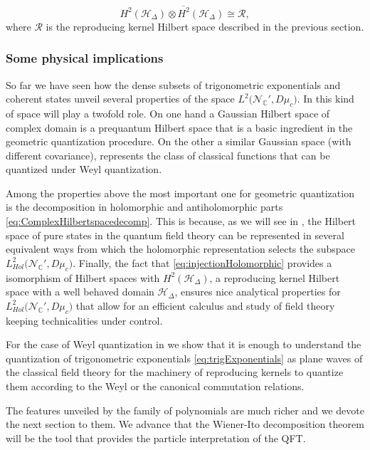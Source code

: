 \documentclass{elsarticle}%
\begin{document}
\begin{equation}
\label{eq:isomorphism}
    H^2(\mathcal{H}_\Delta)\otimes \overline{H^2}(\mathcal{H}_\Delta) \cong \mathcal{R},
\end{equation}
where $\mathcal{R}$ is the reproducing kernel Hilbert space described in the previous section.

\subsubsection{ Some physical implications}

So far we have seen how the dense subsets of trigonometric exponentials and coherent states unveil several properties of the space $L^2\big({\mathcal{N}_{\mathbb{C}}'},D\mu_c\big)$. In \cite{alonsoGeometricFlavours2024} this kind of  space will play a twofold role. On one hand a Gaussian Hilbert space of complex domain is a prequantum Hilbert space that is a  basic ingredient in the geometric quantization procedure. On the other a similar Gaussian space (with different covariance), represents the class of classical functions that can be quantized under Weyl quantization.

Among  the properties above the most important one for geometric quantization is the decomposition in holomorphic and antiholomorphic parts \eqref{eq:ComplexHilbertspacedecomp}. This is because, as we will see in \cite{alonsoGeometricFlavours2024}, the Hilbert space of pure states in the quantum field theory can be represented in several equivalent ways from which the holomorphic representation selects the subspace  $L^2_{Hol}\big({\mathcal{N}_{\mathbb{C}}'},D\mu_c\big)$.
Finally, the fact that \eqref{eq:injectionHolomorphic} provides a isomorphism of Hilbert spaces with  $H^2(\mathcal{H}_\Delta)$, a reproducing kernel Hilbert space with a well behaved domain $\mathcal{H}_\Delta$, ensures nice analytical properties for  $L^2_{Hol}\big({\mathcal{N}_{\mathbb{C}}'},D\mu_c\big)$ that allow for an   efficient calculus and study of field theory keeping technicalities under control.

For the case of Weyl quantization in \cite{alonsoGeometricFlavours2024} we show that it is enough to understand the quantization of trigonometric exponentials \eqref{eq:trigExponentials}  as plane waves of the classical field theory  for the machinery of reproducing kernels  to quantize them according to the Weyl or the canonical commutation relations. 

The features unveiled by the family of polynomials are much richer and we devote the next section to them. We advance that the Wiener-Ito decomposition theorem will be the tool that provides the particle interpretation of the QFT.
\end{document}

